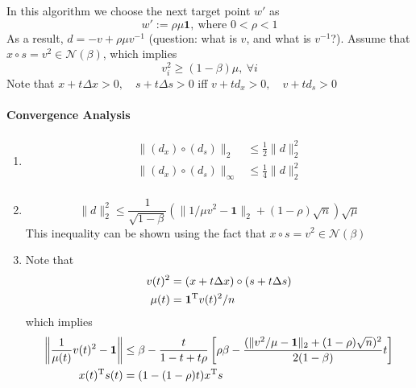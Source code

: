 In this algorithm we choose the next target point $w'$ as
\[
w':=\rho\mu\bm 1,\ \text{where $0<\rho<1$}
\]
As a result, $d=-v+\rho\mu v^{-1}$ (question: what is $v$, and what is $v^{-1}$?).
Assume that $x\circ s = v^2\in\mathcal{N}(\beta)$, which implies
\[
v_i^2\ge(1-\beta)\mu,\ \forall i
\]
Note that 
$
x+t\Delta x>0,\quad
s+t\Delta s>0
$
iff
$
v+td_x>0,\quad
v+td_s>0
$
\paragraph{Convergence Analysis}
\begin{enumerate}
\item
\begin{align*}
\|(d_x)\circ(d_s)\|_2&\le\frac{1}{2}\|d\|_2^2\\
\|(d_x)\circ(d_s)\|_\infty&\le\frac{1}{4}\|d\|_2^2\\
\end{align*}
\item
\[
\|d\|_2^2\le\frac{1}{\sqrt{1-\beta}}\left(\|1/\mu v^2-\bm 1\|_2+(1-\rho)\sqrt{n}\right)\sqrt{\mu}
\]
This inequality can be shown using the fact that $x\circ s = v^2\in\mathcal{N}(\beta)$
\item
Note that
\begin{align*}
v(t)^2&=(x+t\Delta x)\circ(s+t\Delta s)\\
\mu(t)&=\bm 1^{\mathrm T} v(t)^2/n
\end{align*}
which implies
\begin{align*}
\left\|
\frac{1}{\mu(t)}v(t)^2-\bm 1
\right\|
&\le
\beta - \frac{t}{1-t+t\rho}\left[
\rho\beta - \frac{(\|v^2/\mu-\bm 1\|_2 + (1-\rho)\sqrt{n})^2}{2(1-\beta)}t
\right]\\
x(t)^{\mathrm T} s(t) &= (1-(1-\rho)t)x^{\mathrm T} s
\end{align*}
\end{enumerate}

